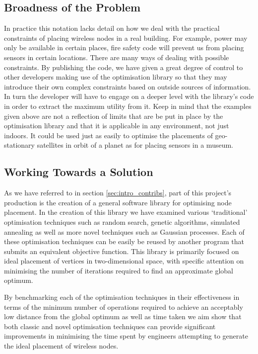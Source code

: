 	\subsection{Broadness of the Problem}
		\label{sec:problem_broadness} 
		In practice this notation lacks detail on how we deal with the practical constraints of placing wireless nodes in a real building. For example, power may only be available in certain places, fire safety code will prevent us from placing sensors in certain locations. There are many ways of dealing with possible constraints. By publishing the code, we have given a great degree of control to other developers making use of the optimisation library so that they may introduce their own complex constraints based on outside sources of information. In turn the developer will have to engage on a deeper level with the library's code in order to extract the maximum utility from it. Keep in mind that the examples given above are not a reflection of limits that are be put in place by the optimisation library and that it is applicable in any environment, not just indoors. It could be used just as easily to optimise the placements of geo-stationary satellites in orbit of a planet as for placing sensors in a museum.
		
	\subsection{Working Towards a Solution}  
		\label{sec:problem_solution} 
		As we have referred to in section \ref{sec:intro_contribs}, part of this project's production is the creation of a general software library for optimising node placement. In the creation of this library we have examined various `traditional' optimisation techniques such as random search, genetic algorithms, simulated annealing as well as more novel techniques such as Gaussian processes. Each of these optimisation techniques can be easily be reused by another program that submits an equivalent objective function. This library is  primarily focused on ideal placement of vertices in two-dimensional space, with specific attention on minimising the number of iterations required to find an approximate global optimum.

		By benchmarking each of the optimisation techniques in their effectiveness in terms of the minimum number of operations required to achieve an acceptably low distance from the global optimum as well as time taken we aim show that both classic and novel optimisation techniques can provide significant improvements in minimising the time spent by engineers attempting to generate the ideal placement of wireless nodes.